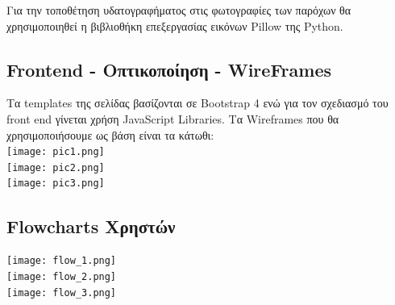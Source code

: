 \documentclass[letterpaper,6pt]{article}
\begin{document}
Για την τοποθέτηση υδατογραφήματος στις φωτογραφίες των παρόχων θα χρησιμοποιηθεί η βιβλιοθήκη επεξεργασίας εικόνων Pillow της Python.


\subsection{Frontend - Οπτικοποίηση - WireFrames}

Τα templates της σελίδας βασίζονται σε Bootstrap 4 ενώ για τον σχεδιασμό του front end γίνεται χρήση JavaScript Libraries.
Tα Wireframes που θα χρησιμοποιήσουμε ως βάση είναι τα κάτωθι:\\
\texttt{[image: pic1.png]}\\
\texttt{[image: pic2.png]}\\
\texttt{[image: pic3.png]}

\subsection{Flowcharts Xρηστών}
\texttt{[image: flow\_1.png]} \\
\texttt{[image: flow\_2.png]} \\
\texttt{[image: flow\_3.png]} \\
\end{document}
